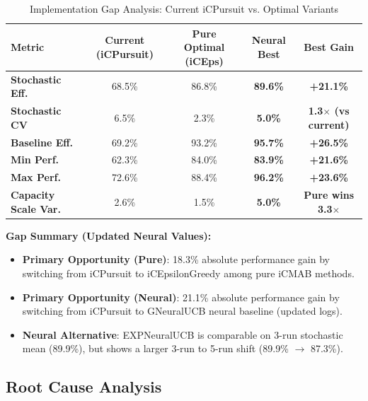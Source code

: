 \documentclass[12pt,a4paper]{article}
\newcommand{\warning}[1]{\textcolor{warningred}{\textbf{#1}}}
\newcommand{\neural}[1]{\textcolor{neuralcolor}{\textbf{#1}}}
\begin{document}
\begin{table}[H]
\centering
\caption{Implementation Gap Analysis: Current iCPursuit vs. Optimal Variants}
\label{tab:implementation-gap}
\begin{tabular}{@{}lcccc@{}}
\toprule
\textbf{Metric} & \textbf{Current (iCPursuit)} & \textbf{Pure Optimal (iCEps)} & \textbf{Neural Best} & \textbf{Best Gain} \\
\midrule
\warning{Stochastic Eff.} & 68.5\% & 86.8\% & \neural{89.6\%} & \neural{+21.1\%} \\
\warning{Stochastic CV} & 6.5\% & 2.3\% & \neural{5.0\%} & \neural{1.3$\times$ (vs current)} \\
\warning{Baseline Eff.} & 69.2\% & 93.2\% & \neural{95.7\%} & \neural{+26.5\%} \\
\warning{Min Perf.} & 62.3\% & 84.0\% & \neural{83.9\%} & \neural{+21.6\%} \\
\warning{Max Perf.} & 72.6\% & 88.4\% & \neural{96.2\%} & \neural{+23.6\%} \\
\midrule
\warning{Capacity Scale Var.} & 2.6\% & 1.5\% & \neural{5.0\%} & \neural{Pure wins 3.3$\times$} \\
\bottomrule
\end{tabular}
\end{table}

\textbf{Gap Summary (Updated Neural Values):}
\begin{itemize}
\item \warning{Primary Opportunity (Pure)}: 18.3\% absolute performance gain by switching from iCPursuit to iCEpsilonGreedy among pure iCMAB methods.
\item \warning{Primary Opportunity (Neural)}: 21.1\% absolute performance gain by switching from iCPursuit to GNeuralUCB neural baseline (updated logs).
\item \neural{Neural Alternative}: EXPNeuralUCB is comparable on 3-run stochastic mean (89.9\%), but shows a larger 3-run to 5-run shift (89.9\% $\rightarrow$ 87.3\%).
\end{itemize}

\subsection{Root Cause Analysis}
\end{document}
